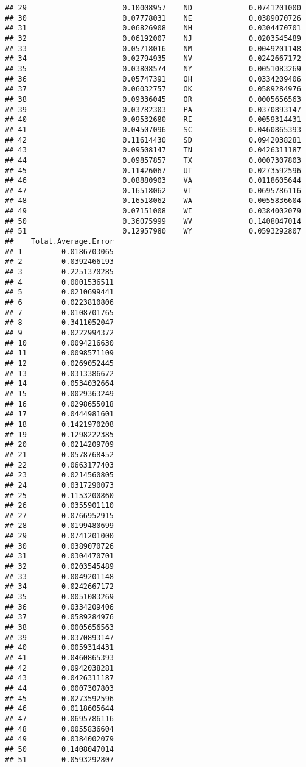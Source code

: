\documentclass{article}\usepackage[]{graphicx}\usepackage[]{color}
\makeatletter
\newenvironment{kframe}{%
 \def\at@end@of@kframe{}%
 \ifinner\ifhmode%
  \def\at@end@of@kframe{\end{minipage}}%
  \begin{minipage}{\columnwidth}%
 \fi\fi%
 \def\FrameCommand##1{\hskip\@totalleftmargin \hskip-\fboxsep
 \colorbox{shadecolor}{##1}\hskip-\fboxsep
     \hskip-\linewidth \hskip-\@totalleftmargin \hskip\columnwidth}%
 \MakeFramed {\advance\hsize-\width
   \@totalleftmargin\z@ \linewidth\hsize
   \@setminipage}}%
 {\par\unskip\endMakeFramed%
 \at@end@of@kframe}
\newenvironment{knitrout}{}{} %
\makeatother
\begin{document}
\begin{knitrout}
\begin{kframe}
\begin{verbatim}
## 29                      0.10008957    ND             0.0741201000
## 30                      0.07778031    NE             0.0389070726
## 31                      0.06826908    NH             0.0304470701
## 32                      0.06192007    NJ             0.0203545489
## 33                      0.05718016    NM             0.0049201148
## 34                      0.02794935    NV             0.0242667172
## 35                      0.03808574    NY             0.0051083269
## 36                      0.05747391    OH             0.0334209406
## 37                      0.06032757    OK             0.0589284976
## 38                      0.09336045    OR             0.0005656563
## 39                      0.03782303    PA             0.0370893147
## 40                      0.09532680    RI             0.0059314431
## 41                      0.04507096    SC             0.0460865393
## 42                      0.11614430    SD             0.0942038281
## 43                      0.09508147    TN             0.0426311187
## 44                      0.09857857    TX             0.0007307803
## 45                      0.11426067    UT             0.0273592596
## 46                      0.08880903    VA             0.0118605644
## 47                      0.16518062    VT             0.0695786116
## 48                      0.16518062    WA             0.0055836604
## 49                      0.07151008    WI             0.0384002079
## 50                      0.36075999    WV             0.1408047014
## 51                      0.12957980    WY             0.0593292807
##    Total.Average.Error
## 1         0.0186703065
## 2         0.0392466193
## 3         0.2251370285
## 4         0.0001536511
## 5         0.0210699441
## 6         0.0223810806
## 7         0.0108701765
## 8         0.3411052047
## 9         0.0222994372
## 10        0.0094216630
## 11        0.0098571109
## 12        0.0269052445
## 13        0.0313386672
## 14        0.0534032664
## 15        0.0029363249
## 16        0.0298655018
## 17        0.0444981601
## 18        0.1421970208
## 19        0.1298222385
## 20        0.0214209709
## 21        0.0578768452
## 22        0.0663177403
## 23        0.0214560805
## 24        0.0317290073
## 25        0.1153200860
## 26        0.0355901110
## 27        0.0766952915
## 28        0.0199480699
## 29        0.0741201000
## 30        0.0389070726
## 31        0.0304470701
## 32        0.0203545489
## 33        0.0049201148
## 34        0.0242667172
## 35        0.0051083269
## 36        0.0334209406
## 37        0.0589284976
## 38        0.0005656563
## 39        0.0370893147
## 40        0.0059314431
## 41        0.0460865393
## 42        0.0942038281
## 43        0.0426311187
## 44        0.0007307803
## 45        0.0273592596
## 46        0.0118605644
## 47        0.0695786116
## 48        0.0055836604
## 49        0.0384002079
## 50        0.1408047014
## 51        0.0593292807
\end{verbatim}
\end{kframe}
\end{knitrout}
\end{document}
